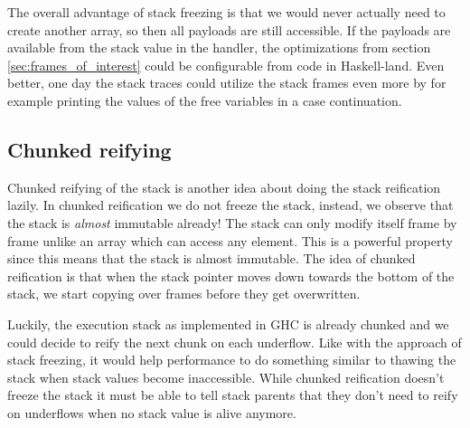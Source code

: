 The overall advantage of stack freezing is that we would never actually
need to create another array, so then all payloads are still accessible.
If the payloads are available from the stack value in the handler,
the optimizations from section \ref{sec:frames_of_interest} could be
configurable from code in Haskell-land. Even better, one day the stack
traces could utilize the stack frames even more by for example printing
the values of the free variables in a case continuation.

\subsection{Chunked reifying} \label{sec:chunked_reifying}

Chunked reifying of the stack is another idea about doing the stack
reification lazily. In chunked reification we do not freeze the stack, instead, we observe
that the stack is \emph{almost} immutable already! The stack can only
modify itself frame by frame unlike an array which can access any
element. This is a powerful property since this means that the stack is
almost immutable. The idea of chunked reification is that when the stack
pointer moves down towards the bottom of the stack, we start
copying over frames before they get overwritten.

Luckily, the execution stack as implemented in GHC is already chunked
and we could decide to reify the next chunk on each underflow. Like with
the approach of stack freezing, it would help performance to do something similar
to thawing the stack when stack values become inaccessible. While
chunked reification doesn't freeze the stack it must be able to tell
stack parents that they don't need to reify on underflows when no stack
value is alive anymore.
